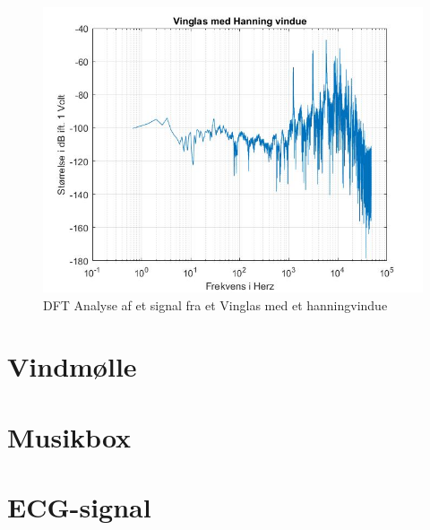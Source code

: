 \begin{figure}[H]
	\centering
	\includegraphics[width=180mm]{figures/Vinglas/hanning.jpg}
	\caption{DFT Analyse af et signal fra et Vinglas med et hanningvindue}
	\label{fig:Vinglas hanning}
\end{figure}



\section{Vindmølle}



\section{Musikbox}


\section{ECG-signal}

